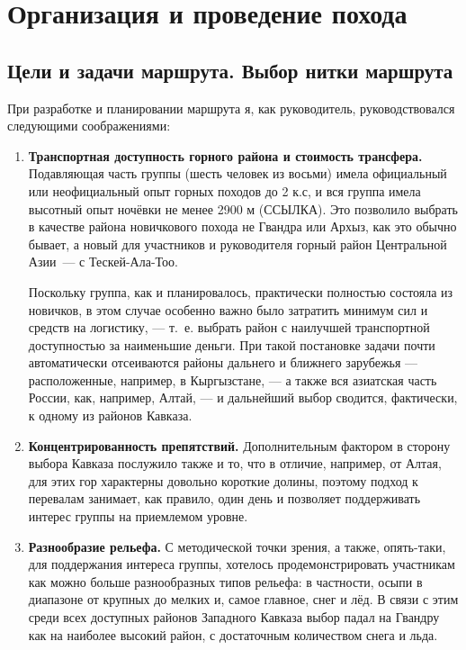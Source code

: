 \section{Организация и проведение похода}
\subsection{Цели и задачи маршрута. Выбор нитки маршрута}
При разработке и планировании маршрута я, как руководитель, руководствовался следующими соображениями:
\begin{enumerate} 
	\item \textbf{Транспортная доступность горного района и стоимость трансфера.}
	Подавляющая часть группы (шесть человек из восьми) имела официальный или неофициальный опыт горных походов до 2 к.с, и вся группа имела высотный опыт ночёвки не менее 2900 м (ССЫЛКА). Это позволило выбрать в качестве района новичкового похода не Гвандра или Архыз, как это обычно бывает, а новый для участников и руководителя горный район Центральной Азии~--- с Тескей-Ала-Тоо.
	
	Поскольку группа, как и планировалось, практически полностью состояла из новичков, в этом случае особенно важно было затратить минимум сил и средств на логистику, --- т.~е. выбрать район с наилучшей транспортной доступностью за наименьшие деньги. При такой постановке задачи почти автоматически отсеиваются районы дальнего и ближнего зарубежья --- расположенные, например, в Кыргызстане, --- а также вся азиатская часть России, как, например, Алтай, --- и дальнейший выбор сводится, фактически, к одному из районов Кавказа. 
	
	\item \textbf{Концентрированность препятствий.}
	Дополнительным фактором в сторону выбора Кавказа послужило также и то, что в отличие, например, от Алтая, для этих гор характерны довольно короткие долины, поэтому подход к перевалам занимает, как правило, один день и позволяет поддерживать интерес группы на приемлемом уровне.
	
	\item \textbf{Разнообразие рельефа.} 
	С методической точки зрения, а также, опять-таки, для поддержания интереса группы, хотелось продемонстрировать участникам как можно больше разнообразных типов рельефа: в частности, осыпи в диапазоне от крупных до мелких и, самое главное, снег и лёд. В связи с этим среди всех доступных районов Западного Кавказа выбор падал на Гвандру как на наиболее высокий район, с достаточным количеством снега и льда. 
	

\end{enumerate}
